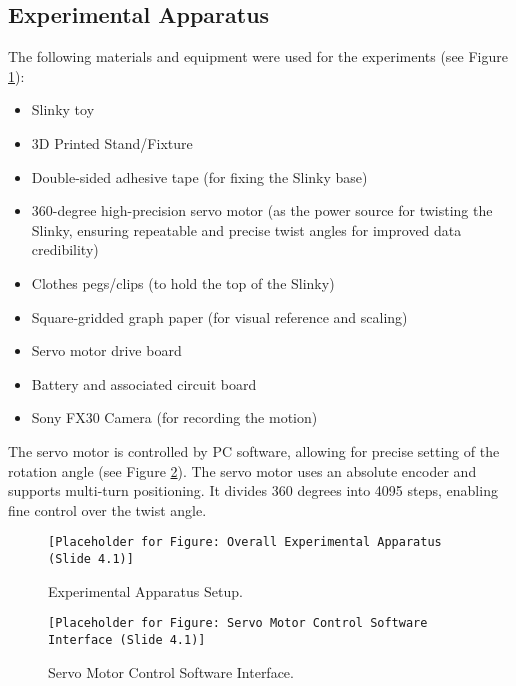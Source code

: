 \documentclass{mcmthesis}  %
\begin{document}
\subsection{Experimental Apparatus}
The following materials and equipment were used for the experiments (see Figure \ref{fig:exp_apparatus}):
\begin{itemize}
    \item Slinky toy
    \item 3D Printed Stand/Fixture
    \item Double-sided adhesive tape (for fixing the Slinky base)
    \item 360-degree high-precision servo motor (as the power source for twisting the Slinky, ensuring repeatable and precise twist angles for improved data credibility)
    \item Clothes pegs/clips (to hold the top of the Slinky)
    \item Square-gridded graph paper (for visual reference and scaling)
    \item Servo motor drive board
    \item Battery and associated circuit board
    \item Sony FX30 Camera (for recording the motion)
\end{itemize}
The servo motor is controlled by PC software, allowing for precise setting of the rotation angle (see Figure \ref{fig:servo_software}). The servo motor uses an absolute encoder and supports multi-turn positioning. It divides 360 degrees into 4095 steps, enabling fine control over the twist angle.

\begin{figure}[h!]
    \centering
    \texttt{[Placeholder for Figure: Overall Experimental Apparatus (Slide 4.1)]}
    \caption{Experimental Apparatus Setup.}
    \label{fig:exp_apparatus}
\end{figure}

\begin{figure}[h!]
    \centering
    \texttt{[Placeholder for Figure: Servo Motor Control Software Interface (Slide 4.1)]}
    \caption{Servo Motor Control Software Interface.}
    \label{fig:servo_software}
\end{figure}
\end{document}
